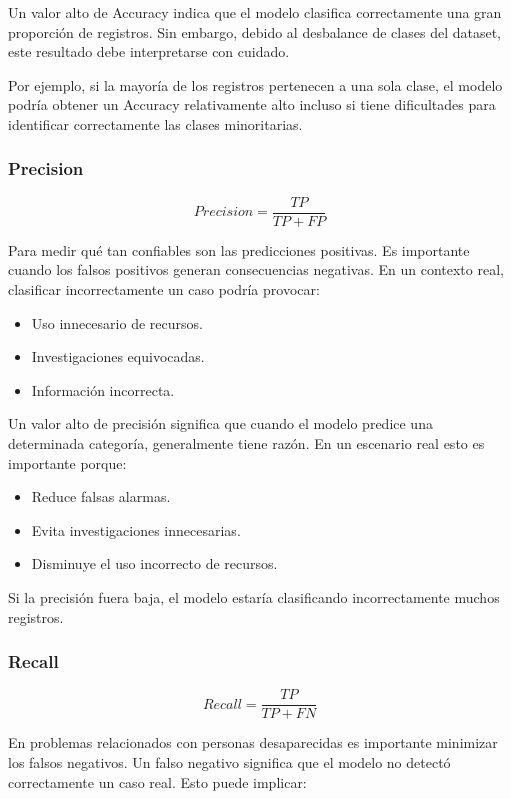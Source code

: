 Un valor alto de Accuracy indica que el modelo clasifica correctamente una gran proporción de registros. Sin embargo, debido al
desbalance de clases del dataset, este resultado debe interpretarse con cuidado.

Por ejemplo, si la mayoría de los registros pertenecen a una sola clase, el modelo podría obtener un Accuracy relativamente alto incluso
si tiene dificultades para identificar correctamente las clases minoritarias.

\subsubsection{Precision}

$$Precision = \frac{TP}{TP + FP}$$

Para medir qué tan confiables son las predicciones positivas. Es importante cuando los falsos positivos generan consecuencias negativas.
En un contexto real, clasificar incorrectamente un caso podría provocar:

\begin{itemize}
    \item Uso innecesario de recursos.
    \item Investigaciones equivocadas.
    \item Información incorrecta.
\end{itemize}

Un valor alto de precisión significa que cuando el modelo predice una determinada categoría, generalmente tiene razón. En un escenario real
esto es importante porque:

\begin{itemize}
    \item Reduce falsas alarmas.
    \item Evita investigaciones innecesarias.
    \item Disminuye el uso incorrecto de recursos.
\end{itemize}

Si la precisión fuera baja, el modelo estaría clasificando incorrectamente muchos registros.

\subsubsection{Recall}

$$Recall = \frac{TP}{TP + FN}$$

En problemas relacionados con personas desaparecidas es importante minimizar los falsos negativos. Un falso negativo significa
que el modelo no detectó correctamente un caso real. Esto puede implicar:

